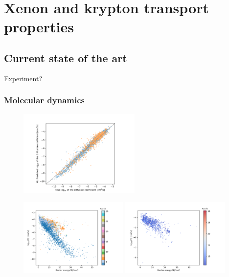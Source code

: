 \documentclass[main]{subfiles}
\begin{document}
\chapter{Xenon and krypton transport properties}
\vspace*{-1\baselineskip}

\section{Current state of the art}

Experiment? 

\subsection{Molecular dynamics}

\begin{figure}[ht]
    \centering
        \includegraphics[width=6cm]{figures/5-diffusion/diffusion_prediction.pdf}
        \caption{}
        \label{fgr:}
\end{figure}

\begin{figure}[ht]
    \centering
        \includegraphics[width=0.48\textwidth]{figures/5-diffusion/difflog_barrier_Df_uff.pdf}
        \includegraphics[width=0.48\textwidth]{figures/5-diffusion/difflog_barrier_Df_uff_2.pdf}
        \caption{}
        \label{fgr:}
\end{figure}
\end{document}
